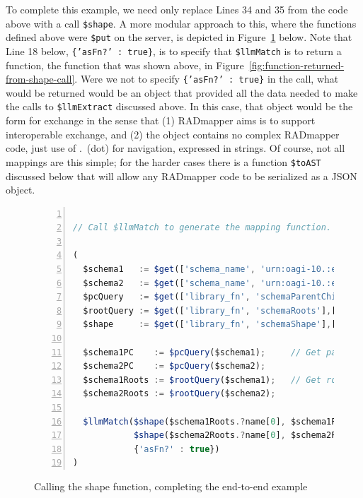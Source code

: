 \documentclass[10pt,letterpaper]{article} %
\newcommand{\stt}[1]{\texttt{#1}} %
\begin{document}
To complete this example, we need only replace Lines 34 and 35 from the code above with a call \stt{\$shape}.
A more modular approach to this, where the functions defined above were \stt{\$put} on the server, is depicted in Figure~\ref{fig:call-to-shape} below.
Note that Line 18 below, \stt{\{'asFn?' : true\}}, is to specify that \stt{\$llmMatch} is to return a function, the function that was shown above, in Figure~\ref{fig:function-returned-from-shape-call}.
Were we not to specify  \stt{\{'asFn?' : true\}} in the call, what would be returned would be an object that provided all the data needed to make the calls to \stt{\$llmExtract} discussed above.
In this case, that object would be the form for exchange in the sense that
(1) RADmapper aims is to support interoperable exchange, and
(2) the object contains no complex RADmapper code, just use of .~(dot) for navigation, expressed in strings.
Of course, not all mappings are this simple; for the harder cases there is a function \stt{\$toAST} discussed below that will allow any RADmapper code to be serialized as a JSON object.


\begin{figure}[H]
  \caption{Calling the shape function, completing the end-to-end example}
  \label{fig:call-to-shape}
\begin{lstlisting}[language=JavaScript,numberstyle=\scriptsize,basicstyle=\ttfamily\scriptsize,numbers=left,stepnumber=1,breaklines=true]

// Call $llmMatch to generate the mapping function. Note use of {'asFn?' true} in the call.

(
  $schema1   := $get(['schema_name', 'urn:oagi-10.:elena.2023-07-02.ProcessInvoice-BC_1_v2'], ['schema_content']);
  $schema2   := $get(['schema_name', 'urn:oagi-10.:elena.2023-07-02.ProcessInvoice-BC_2_v2'], ['schema_content']);
  $pcQuery   := $get(['library_fn', 'schemaParentChild'],['fn_exe']).fn_exe;
  $rootQuery := $get(['library_fn', 'schemaRoots'],['fn_exe']).fn_exe;
  $shape     := $get(['library_fn', 'schemaShape'],['fn_exe']).fn_exe;

  $schema1PC    := $pcQuery($schema1);     // Get parent-child relationships of each schema.
  $schema2PC    := $pcQuery($schema2);
  $schema1Roots := $rootQuery($schema1);   // Get root elements of each schema.
  $schema2Roots := $rootQuery($schema2);

  $llmMatch($shape($schema1Roots.?name[0], $schema1PC), // [0] here is cheating a bit; there could be multiple roots.
            $shape($schema2Roots.?name[0], $schema2PC), // Call $llmMatch to do shape matching
            {'asFn?' : true})
)
\end{lstlisting}
\end{figure} \vspace{-3em}
\end{document}
